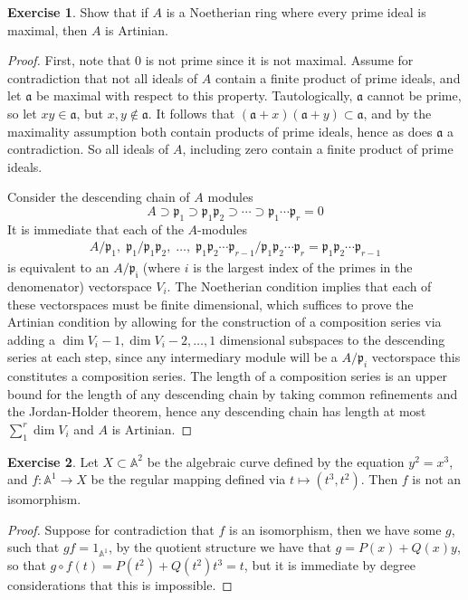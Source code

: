 \documentclass[11pt]{article}
\theoremstyle{definition}
\newtheorem{exe}{Exercise}
\begin{document}
    \begin{exe}
        Show that if \(A\) is a Noetherian ring where every prime ideal is maximal, then \(A\) is Artinian.
        \begin{proof}
           First, note that \(0\) is not prime since it is not maximal. Assume for contradiction that not all ideals of \(A\) contain a finite product of prime ideals, and let \(\mathfrak{a}\) be maximal with respect to this property. Tautologically, \(\mathfrak{a}\) cannot be prime, so let \(xy \in \mathfrak{a}\), but \(x,y \not \in \mathfrak{a}\). It follows that \((\mathfrak{a} + x)(\mathfrak{a} + y) \subset \mathfrak{a}\), and by the maximality assumption both contain products of prime ideals, hence as does \(\mathfrak{a}\) a contradiction. So all ideals of \(A\), including zero contain a finite product of prime ideals.

           Consider the descending chain of \(A\) modules \[A \supset \mathfrak{p}_1 \supset \mathfrak{p}_1\mathfrak{p}_2 \supset \cdots \supset \mathfrak{p}_1 \cdots \mathfrak{p}_r = 0\]
           It is immediate that each of the \(A\)-modules
           \begin{align*}
            A/\mathfrak{p}_1, \; \mathfrak{p}_1/\mathfrak{p}_1\mathfrak{p}_2, \; \hdots, \; \mathfrak{p}_1\mathfrak{p}_2\cdots\mathfrak{p}_{r-1}/\mathfrak{p}_1\mathfrak{p}_2\cdots\mathfrak{p}_r = \mathfrak{p}_1\mathfrak{p}_2\cdots\mathfrak{p}_{r-1}
           \end{align*}
           is equivalent to an \(A/\mathfrak{p_i}\) (where \(i\) is the largest index of the primes in the denomenator) vectorspace \(V_i\). The Noetherian condition implies that each of these vectorspaces must be finite dimensional, which suffices to prove the Artinian condition by allowing for the construction of a composition series via adding a \(\dim V_i - 1, \dim V_i - 2, \hdots, 1\) dimensional subspaces to the descending series at each step, since any intermediary module will be a \(A/\mathfrak{p}_i\) vectorspace this constitutes a composition series. The length of a composition series is an upper bound for the length of any descending chain by taking common refinements and the Jordan-Holder theorem, hence any descending chain has length at most \(\sum_1^r \dim V_i\) and \(A\) is Artinian.
        \end{proof}
    \end{exe}
    \begin{exe}
        Let \(X \subset \mathbb{A}^2\) be the algebraic curve defined by the equation \(y^2 = x^3\), and \(f: \mathbb{A}^1 \to X\) be the regular mapping defined via \(t \mapsto (t^3,t^2)\). Then \(f\) is not an isomorphism.
        \begin{proof}
            Suppose for contradiction that \(f\) is an isomorphism, then we have some \(g\), such that \(gf = 1_{\mathbb{A}^1}\), by the quotient structure we have that \(g = P(x) + Q(x)y\), so that \(g\circ f(t) = P(t^2) + Q(t^2)t^3 = t\), but it is immediate by degree considerations that this is impossible.
        \end{proof}
    \end{exe}
\end{document}

